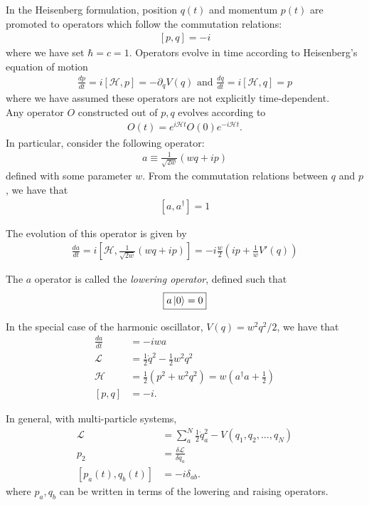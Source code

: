 \documentclass{book}
\theoremstyle{definition}
\newcommand{\p}{\partial}
\newcommand{\lag}{\mathcal{L}}
\newcommand{\ham}{\mathcal{H}}
\newcommand{\f}[2]{\frac{#1}{#2}}
\newcommand{\lp}{\left(}
\newcommand{\rp}{\right)}
\newcommand{\lb}{\left[}
\newcommand{\rb}{\right]}
\begin{document}
In the Heisenberg formulation, position $q(t)$ and momentum $p(t)$ are promoted to operators which follow the commutation relations:
\begin{align}
\boxed{[p,q] = -i}
\end{align}
where we have set $\hbar = c = 1$. Operators evolve in time according to Heisenberg's equation of motion
\begin{align}
\boxed{\f{dp}{dt} = i[\ham , p] = -\p_q V(q)} \text{ and } \boxed{\f{dq}{dt} = i[\ham , q] = p}
\end{align}
where we have assumed these operators are not explicitly time-dependent. \\

Any operator $O$ constructed out of $p,q$ evolves according to 
\begin{align}
O(t) = e^{i\ham t} O(0) e^{-i\ham t}.
\end{align} 
In particular, consider the following operator:
\begin{align}
a \equiv \f{1}{\sqrt{2w}}\lp wq + ip \rp
\end{align}
defined with some parameter $w$. From the commutation relations between $q$ and $p$, we have that
\begin{align}
\boxed{[a,a^\dagger] = 1}
\end{align}


The evolution of this operator is given by
\begin{align}
\boxed{\f{da}{dt} = i\lb\ham, \f{1}{\sqrt{2w}}(wq + ip)\rb = -i\f{w}{2}\lp ip + \f{1}{w}V'(q) \rp}
\end{align}

The $a$ operator is called the \textit{lowering operator}, defined such that
\begin{align}
\boxed{a\ket{0} = 0}
\end{align}

In the special case of the harmonic oscillator, $V(q) = w^2 q^2/2$, we have that 
\begin{align}
\f{da}{dt} &= -iw a\\
\lag &= \f{1}{2}\dot{q}^2 - \f{1}{2}w^2 q^2\\
\ham &= \f{1}{2}(p^2 + w^2 q^2) = w\lp a^\dagger a + \f{1}{2} \rp\\
[p, q] &= -i.
\end{align}



In general, with multi-particle systems,
\begin{align}
\lag &= \sum_a^N \f{1}{2}\dot{q}_a^2 - V(q_1, q_2, \dots, q_N)\\
p_2 &= \f{\delta \lag}{\delta \dot{q}_a}\\
[p_a(t), q_b(t)] &= -i\delta_{ab}.
\end{align}
where $p_a, q_b$ can be written in terms of the lowering and raising operators. \\
\end{document}
